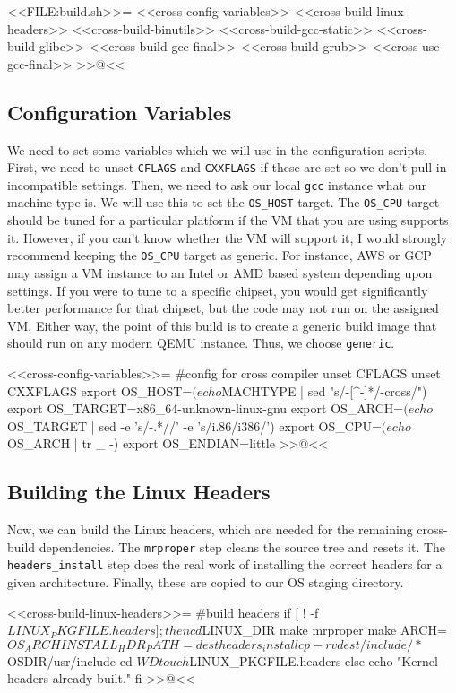 <<FILE:build.sh>>=
    <<cross-config-variables>>
    <<cross-build-linux-headers>>
    <<cross-build-binutils>>
    <<cross-build-gcc-static>>
    <<cross-build-glibc>>
    <<cross-build-gcc-final>>
    <<cross-build-grub>>
    <<cross-use-gcc-final>>
>>@<<

\subsection{Configuration Variables}

We need to set some variables which we will use in the configuration scripts.
First, we need to unset \verb/CFLAGS/ and \verb/CXXFLAGS/ if these are set so we
don't pull in incompatible settings.  Then, we need to ask our local \verb/gcc/
instance what our machine type is.  We will use this to set the \verb/OS_HOST/
target.  The \verb/OS_CPU/ target should be tuned for a particular platform if
the VM that you are using supports it.  However, if you can't know whether the
VM will support it, I would strongly recommend keeping the \verb/OS_CPU/ target
as generic.  For instance, AWS or GCP may assign a VM instance to an Intel or
AMD based system depending upon settings.  If you were to tune to a specific
chipset, you would get significantly better performance for that chipset, but
the code may not run on the assigned VM.  Either way, the point of this build is
to create a generic build image that should run on any modern QEMU instance.
Thus, we choose \verb/generic/.

<<cross-config-variables>>=
#config for cross compiler
unset CFLAGS
unset CXXFLAGS
export OS_HOST=$(echo ${MACHTYPE} | sed "s/-[^-]*/-cross/")
export OS_TARGET=x86_64-unknown-linux-gnu
export OS_ARCH=$(echo ${OS_TARGET} | sed -e 's/-.*//' -e 's/i.86/i386/')
export OS_CPU=$(echo ${OS_ARCH} | tr _ -)
export OS_ENDIAN=little
>>@<<

\subsection{Building the Linux Headers}

Now, we can build the Linux headers, which are needed for the remaining
cross-build dependencies.  The \verb/mrproper/ step cleans the source tree and
resets it. The \verb/headers_install/ step does the real work of installing the
correct headers for a given architecture.  Finally, these are copied to our OS
staging directory.

<<cross-build-linux-headers>>=
#build headers
if [ ! -f ${LINUX_PKGFILE}.headers ]; then
    cd ${LINUX_DIR}
    make mrproper
    make ARCH=${OS_ARCH} INSTALL_HDR_PATH=dest headers_install
    cp -rv dest/include/* ${OSDIR}/usr/include
    cd ${WD}
    touch ${LINUX_PKGFILE}.headers
else
    echo "Kernel headers already built."
fi
>>@<<

